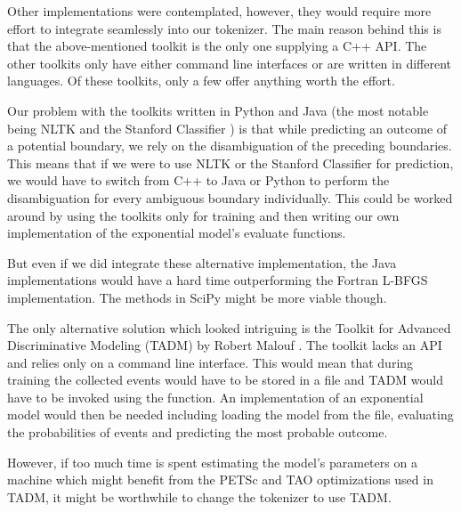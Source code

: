 Other implementations were contemplated, however, they would require more effort
to integrate seamlessly into our tokenizer. The main reason behind this is
that the above-mentioned toolkit is the only one supplying a C++ API. The other
toolkits only have either command line interfaces or are written in different
languages. Of these toolkits, only a few offer anything worth the effort.

Our problem with the toolkits written in Python and Java (the most notable
being NLTK \cite{web-nltk} and the Stanford Classifier \cite{web-stanford}) is
that while predicting an outcome of a potential boundary, we rely on the
disambiguation of the preceding boundaries. This means that if we were to use
NLTK or the Stanford Classifier for prediction, we would have to switch from
C++ to Java or Python to perform the disambiguation for every ambiguous
boundary individually. This could be worked around by using the toolkits only
for training and then writing our own implementation of the exponential model's
evaluate functions.

But even if we did integrate these alternative implementation, the Java
implementations would have a hard time outperforming the Fortran L-BFGS
implementation. The methods in SciPy might be more viable though.

The only alternative solution which looked intriguing is the Toolkit for
Advanced Discriminative Modeling (TADM) by Robert Malouf \cite{web-tadm}. The
toolkit lacks an API and relies only on a command line interface. This would
mean that during training the collected events would have to be stored in a
file and TADM would have to be invoked using the  function. An
implementation of an exponential model would then be needed including loading
the model from the file, evaluating the probabilities of events and predicting
the most probable outcome.

However, if too much time is spent estimating the model's parameters on a
machine which might benefit from the PETSc and TAO optimizations used in TADM,
it might be worthwhile to change the tokenizer to use TADM.
